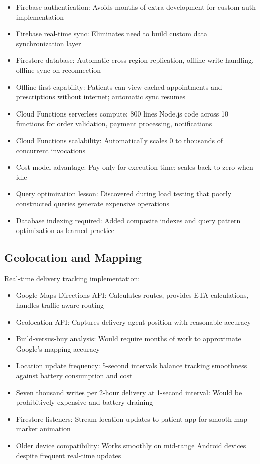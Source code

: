 \documentclass[12pt,a4paper]{report}
\begin{document}
\begin{itemize}
  \item Firebase authentication: Avoids months of extra development for custom auth implementation
  \item Firebase real-time sync: Eliminates need to build custom data synchronization layer
  \item Firestore database: Automatic cross-region replication, offline write handling, offline sync on reconnection
  \item Offline-first capability: Patients can view cached appointments and prescriptions without internet; automatic sync resumes
  \item Cloud Functions serverless compute: 800 lines Node.js code across 10 functions for order validation, payment processing, notifications
  \item Cloud Functions scalability: Automatically scales 0 to thousands of concurrent invocations
  \item Cost model advantage: Pay only for execution time; scales back to zero when idle
  \item Query optimization lesson: Discovered during load testing that poorly constructed queries generate expensive operations
  \item Database indexing required: Added composite indexes and query pattern optimization as learned practice
\end{itemize}

\subsection{Geolocation and Mapping}

Real-time delivery tracking implementation:

\begin{itemize}
  \item Google Maps Directions API: Calculates routes, provides ETA calculations, handles traffic-aware routing
  \item Geolocation API: Captures delivery agent position with reasonable accuracy
  \item Build-versus-buy analysis: Would require months of work to approximate Google's mapping accuracy
  \item Location update frequency: 5-second intervals balance tracking smoothness against battery consumption and cost
  \item Seven thousand writes per 2-hour delivery at 1-second interval: Would be prohibitively expensive and battery-draining
  \item Firestore listeners: Stream location updates to patient app for smooth map marker animation
  \item Older device compatibility: Works smoothly on mid-range Android devices despite frequent real-time updates
\end{itemize}
\end{document}
